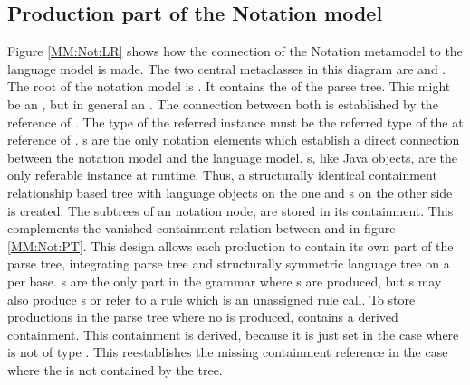 \subsection{Production part of the Notation model} \label{sec:MM:Not:Prod}
Figure \ref{MM:Not:LR} shows how the connection of the Notation metamodel to the language model is made. The two central metaclasses in this diagram are  and . The root of the notation model is . It contains the  of the parse tree. This might be an , but in general an . The connection between both is established by the reference  of .  The type of the referred instance must be the referred type of the  at  reference of . s are the only notation elements which establish a direct connection between the notation model and the language model. s, like Java objects, are the only referable instance at runtime. Thus, a structurally identical containment relationship based tree with language objects on the one and s on the other side is created. The subtrees of an notation node,  are stored in its  containment. This complements the vanished containment relation between  and  in figure \ref{MM:Not:PT}. This design allows each  production to contain its own part of the parse tree, integrating parse tree and structurally symmetric language tree on a per  base. s are the only part in the grammar where s are produced, but s may also produce s or refer to a rule which is an unassigned rule call. To store productions in the parse tree where no  is produced,  contains a derived  containment. This containment is derived, because it is just set in the case where  is not of type . This reestablishes the missing containment reference in the case where the  is not contained by the  tree. \\
